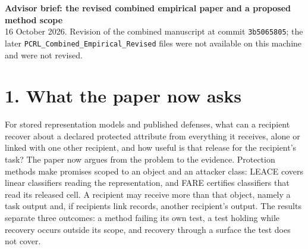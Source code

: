 \documentclass[10pt]{article}
\begin{document}
{\large\bfseries Advisor brief: the revised combined empirical paper and a proposed method scope}\\[0.2em]
{\small 16 October 2026. Revision of the combined manuscript at commit \texttt{3b5065805}; the later
\texttt{PCRL\_Combined\_Empirical\_Revised} files were not available on this machine and were not revised.}

\section*{1. What the paper now asks}
For stored representation models and published defenses, what can a recipient recover about a declared protected
attribute from everything it receives, alone or linked with one other recipient, and how useful is that release for
the recipient's task? The paper now argues from the problem to the evidence. Protection methods make promises scoped to
an object and an attacker class: LEACE covers linear classifiers reading the representation, and FARE certifies
classifiers that read its released cell. A recipient may receive more than that object, namely a task output and, if
recipients link records, another recipient's output. The results separate three outcomes: a method failing its own
test, a test holding while recovery occurs outside its scope, and recovery through a surface the test does not cover.
\end{document}
